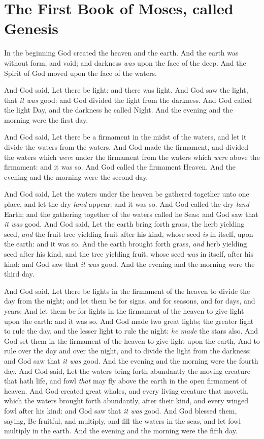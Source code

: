 \documentclass[11pt,letterpaper,oneside]{memoir}
\begin{document}
\chapter[Genesis]{The First Book of Moses, called Genesis}
In the beginning God created the heaven and the earth. And the earth was
without form, and void; and darkness \emph{was} upon the face of the
deep. And the Spirit of God moved upon the face of the waters.

And God said, Let there be light: and there was light. And God saw the
light, that \emph{it was} good: and God divided the light from the
darkness. And God called the light Day, and the darkness he called
Night. And the evening and the morning were the first day.

And God said, Let there be a firmament in the midst of the waters, and
let it divide the waters from the waters. And God made the firmament,
and divided the waters which \emph{were} under the firmament from the
waters which \emph{were} above the firmament: and it was so. And God
called the firmament Heaven. And the evening and the morning were the
second day.

And God said, Let the waters under the heaven be gathered together unto
one place, and let the dry \emph{land} appear: and it was so. And God
called the dry \emph{land} Earth; and the gathering together of the
waters called he Seas: and God saw that \emph{it was} good. And God
said, Let the earth bring forth grass, the herb yielding seed,
\emph{and} the fruit tree yielding fruit after his kind, whose seed
\emph{is} in itself, upon the earth: and it was so. And the earth
brought forth grass, \emph{and} herb yielding seed after his kind, and
the tree yielding fruit, whose seed \emph{was} in itself, after his
kind: and God saw that \emph{it was} good. And the evening and the
morning were the third day.

And God said, Let there be lights in the firmament of the heaven to
divide the day from the night; and let them be for signs, and for
seasons, and for days, and years: And let them be for lights in the
firmament of the heaven to give light upon the earth: and it was so. And
God made two great lights; the greater light to rule the day, and the
lesser light to rule the night: \emph{he made} the stars also. And God
set them in the firmament of the heaven to give light upon the earth,
And to rule over the day and over the night, and to divide the light
from the darkness: and God saw that \emph{it was} good. And the evening
and the morning were the fourth day. And God said, Let the waters bring
forth abundantly the moving creature that hath life, and fowl
\emph{that} may fly above the earth in the open firmament of heaven. And
God created great whales, and every living creature that moveth, which
the waters brought forth abundantly, after their kind, and every winged
fowl after his kind: and God saw that \emph{it was} good. And God
blessed them, saying, Be fruitful, and multiply, and fill the waters in
the seas, and let fowl multiply in the earth. And the evening and the
morning were the fifth day.
\end{document}
